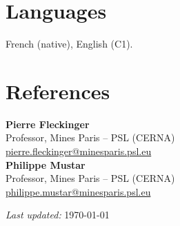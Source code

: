 \documentclass[11pt,a4paper]{article}
\begin{document}
\section{Languages}

French (native), English (C1).

\section{References}

\textbf{Pierre Fleckinger} \\
Professor, Mines Paris -- PSL (CERNA) \\
\href{mailto:pierre.fleckinger@minesparis.psl.eu}{pierre.fleckinger@minesparis.psl.eu}
\\[0.4em]
\textbf{Philippe Mustar} \\
Professor, Mines Paris -- PSL (CERNA) \\
\href{mailto:philippe.mustar@minesparis.psl.eu}{philippe.mustar@minesparis.psl.eu}

\vfill
{\footnotesize \emph{Last updated:} \today}
\end{document}
